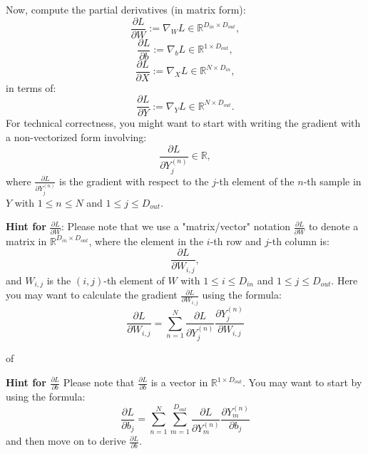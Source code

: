 \documentclass[lang=cn,11pt]{elegantbook}
\begin{document}
Now, compute the partial derivatives (in matrix form):
\begin{equation}
    \frac{\partial L}{\partial W} :=\nabla_W L \in \mathbb{R}^{D_{in} \times D_{out}},
\end{equation}
\begin{equation}
    \frac{\partial L}{\partial b} :=\nabla_b L \in \mathbb{R}^{1 \times D_{out}},
\end{equation}
\begin{equation}
    \frac{\partial L}{\partial X} := \nabla_X L \in \mathbb{R}^{N \times D_{in}},
\end{equation}
in terms of:
\begin{equation}
    \frac{\partial L}{\partial Y}:= \nabla_Y L \in \mathbb{R}^{N \times D_{out}}.
\end{equation}
For technical correctness, you might want to start with writing the gradient with a non-vectorized form involving:
\begin{equation}
    \frac{\partial L}{\partial Y^{(n)}_j} \in \mathbb{R},
\end{equation}
where $\frac{\partial L}{\partial Y^{(n)}_j}$ is the gradient with respect to the $j$-th element of the $n$-th sample in $Y$ with $1 \leq n \leq N$ and $1 \leq j \leq D_{out}$.

\textbf{Hint for } $\frac{\partial L}{\partial W}$:
Please note that we use a "matrix/vector" notation $\frac{\partial L}{\partial W}$ to denote a matrix in $\mathbb{R}^{D_{in} \times D_{out}}$, where the element in the $i$-th row and $j$-th column is:
\begin{equation}
    \frac{\partial L}{\partial W_{i,j}},
\end{equation}
and $W_{i,j}$ is the $(i,j)$-th element of $W$ with \( 1 \leq i \leq D_{in} \) and \( 1 \leq j \leq D_{out} \). Here you may want to calculate the gradient \( \frac{\partial L}{\partial W_{i,j}} \) using the formula: \[
\frac{\partial L}{\partial W_{i,j}} = \sum_{n=1}^{N} \frac{\partial L}{\partial Y_j^{(n)}} \frac{\partial Y_j^{(n)}}{\partial W_{i,j}}
\]
\begin{solution}
    of 
\end{solution}

\textbf{Hint for \( \frac{\partial L}{\partial b} \)}
Please note that \( \frac{\partial L}{\partial b} \) is a vector in \( \mathbb{R}^{1 \times D_{out}} \). You may want to start by using the formula:\[
\frac{\partial L}{\partial b_j} = \sum_{n=1}^{N} \sum_{m=1}^{D_{out}} \frac{\partial L}{\partial Y_m^{(n)}} \frac{\partial Y_m^{(n)}}{\partial b_j}
\]and then move on to derive \( \frac{\partial L}{\partial b} \).
\end{document}
